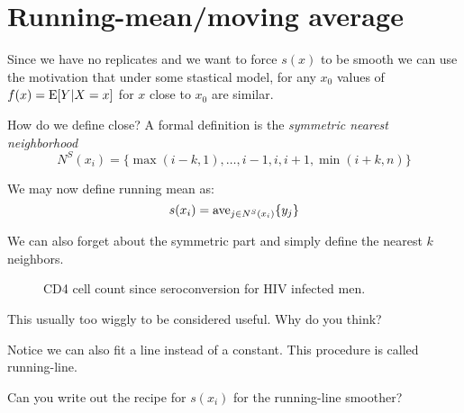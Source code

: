 \section{Running-mean/moving average}
Since we have no replicates and we want to force $s(x)$ to be smooth
we can use the motivation that under some stastical model, for any
$x_0$ values of $f(x)=\mbox{E}[Y|X=x]$ for 
$x$ close to $x_0$ are similar. 

How do we define close? 
A formal definition is the {\it symmetric nearest neighborhood}
\[
N^S(x_i) = \{ \max(i-k,1),\dots,i-1,i,i+1,\min(i+k,n) \}
\]

We may now define running mean as:
\[
s(x_i) = \mbox{ave}_{j \in N^S(x_i)} \{ y_j \}
\]

We can also forget about the symmetric part and simply define the
nearest $k$ neighbors. 


\begin{figure}[htp]
\caption{\label{f2.4} CD4 cell count since seroconversion for HIV infected men.}
\centerline{}
\end{figure}

This usually too wiggly to be considered useful.  Why do you think?

Notice we can also fit a line instead of a constant. This procedure is
called running-line.

Can you write out the recipe for $s(x_i)$ for the running-line smoother?




